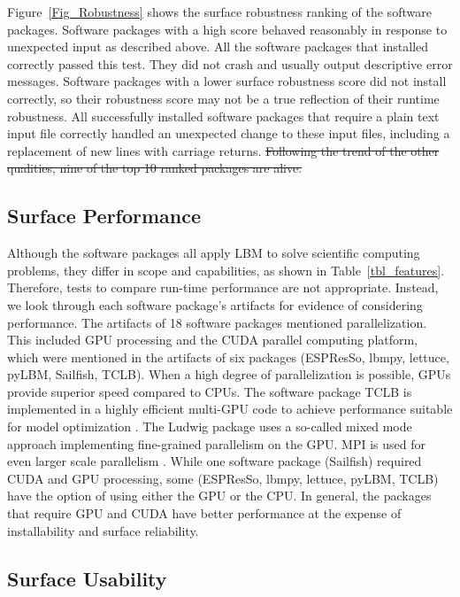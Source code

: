 \documentclass[final, 3p, times, authoryear]{elsarticle}
\providecommand{\DIFdeltex}[1]{{\protect\color{red}\sout{#1}}}                      %
\providecommand{\DIFdelbegin}{} %
\providecommand{\DIFdelend}{} %
\providecommand{\DIFdel}[1]{\texorpdfstring{\DIFdeltex{#1}}{}} %
\begin{document}
Figure~\ref{Fig_Robustness} shows the surface robustness ranking of the software
packages. Software packages with a high score behaved reasonably in response to
unexpected input as described above. All the software packages that installed
correctly passed this test. They did not crash and usually output descriptive
error messages. Software packages with a lower surface robustness score did not
install correctly, so their robustness score may not be a true reflection of
their runtime robustness. All successfully installed software packages that
require a plain text input file correctly handled an unexpected change to these
input files, including a replacement of new lines with carriage returns.
\DIFdelbegin \DIFdel{Following the trend of the other qualities, nine of the top 10 ranked packages
are alive.
}\DIFdelend 

\subsection{Surface Performance}

Although the software packages all apply LBM to solve scientific computing
problems, they differ in scope and capabilities, as shown in
Table~\ref{tbl_features}. Therefore, tests to compare run-time performance are
not appropriate. Instead, we look through each software package's artifacts
for evidence of considering performance. The artifacts of 18 software packages
mentioned parallelization. This included GPU processing and the CUDA parallel
computing platform, which were mentioned in the artifacts of six packages
(ESPResSo, lbmpy, lettuce, pyLBM, Sailfish, TCLB). When a high degree of
parallelization is possible, GPUs provide superior speed compared to CPUs. The
software package TCLB is implemented in a highly efficient multi-GPU code to
achieve performance suitable for model optimization \citep{rutkowski2020open}.
The Ludwig package uses a so-called mixed mode approach implementing
fine-grained parallelism on the GPU.  MPI is used for even larger scale
parallelism \citep{gray2013ludwig}. While one software package (Sailfish)
required CUDA and GPU processing, some (ESPResSo, lbmpy, lettuce, pyLBM, TCLB)
have the option of using either the GPU or the CPU. In general, the packages
that require GPU and CUDA have better performance at the expense of
installability and surface reliability.

\subsection{Surface Usability}
\end{document}
